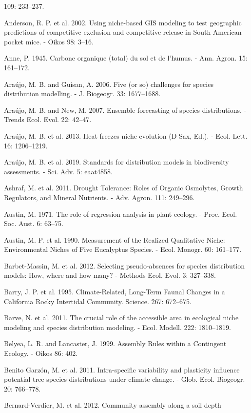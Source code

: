 \documentclass[11pt,twoside]{reedthesis}
\begin{document}
109: 233--237.\par
Anderson, R. P. et al. 2002. Using niche-based GIS modeling to test
geographic predictions of competitive exclusion and competitive release
in South American pocket mice. - Oikos 98: 3--16.\par
Anne, P. 1945. Carbone organique (total) du sol et de l'humus. - Ann.
Agron. 15: 161--172.\par
Araújo, M. B. and Guisan, A. 2006. Five (or so) challenges for species
distribution modelling. - J. Biogeogr. 33: 1677--1688.\par
Araújo, M. B. and New, M. 2007. Ensemble forecasting of species
distributions. - Trends Ecol. Evol. 22: 42--47.\par
Araújo, M. B. et al. 2013. Heat freezes niche evolution (D Sax, Ed.). -
Ecol. Lett. 16: 1206--1219.\par
Araújo, M. B. et al. 2019. Standards for distribution models in
biodiversity assessments. - Sci. Adv. 5: eaat4858.\par
Ashraf, M. et al. 2011. Drought Tolerance: Roles of Organic Osmolytes,
Growth Regulators, and Mineral Nutrients. - Adv. Agron. 111:
249--296.\par
Austin, M. 1971. The role of regression analysis in plant ecology. -
Proc. Ecol. Soc. Aust. 6: 63--75.\par
Austin, M. P. et al. 1990. Measurement of the Realized Qualitative
Niche: Environmental Niches of Five Eucalyptus Species. - Ecol. Monogr.
60: 161--177.\par
Barbet-Massin, M. et al. 2012. Selecting pseudo-absences for species
distribution models: How, where and how many? - Methods Ecol. Evol. 3:
327--338.\par
Barry, J. P. et al. 1995. Climate-Related, Long-Term Faunal Changes in a
California Rocky Intertidal Community. Science. 267: 672--675.\par
Barve, N. et al. 2011. The crucial role of the accessible area in
ecological niche modeling and species distribution modeling. - Ecol.
Modell. 222: 1810--1819.\par
Belyea, L. R. and Lancaster, J. 1999. Assembly Rules within a Contingent
Ecology. - Oikos 86: 402.\par
Benito Garzón, M. et al. 2011. Intra-specific variability and plasticity
influence potential tree species distributions under climate change. -
Glob. Ecol. Biogeogr. 20: 766--778.\par
Bernard-Verdier, M. et al. 2012. Community assembly along a soil depth
\end{document}
